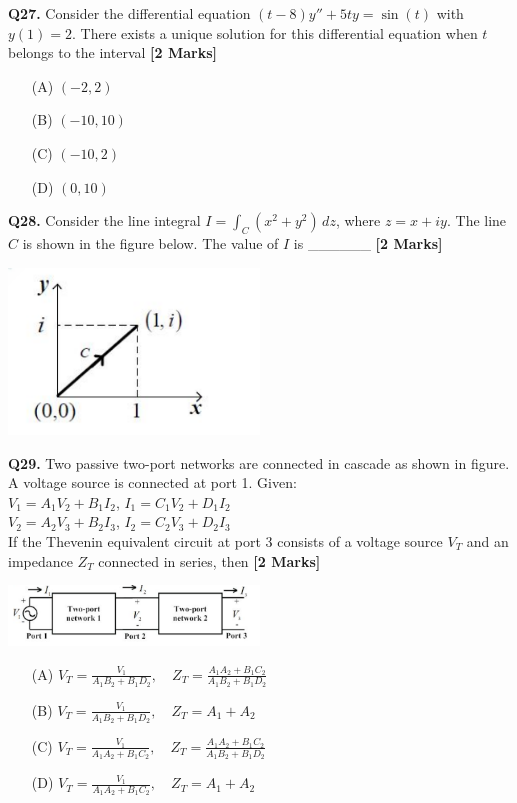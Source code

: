 \documentclass[11pt]{article}
\newcommand{\questionb}[2]{
    \noindent\textbf{Q#2.} #1 \hfill \textbf{[2 Marks]}
}
\begin{document}
\questionb{Consider the differential equation \( (t - 8)y'' + 5ty = \sin(t) \) with \( y(1) = 2 \). There exists a unique solution for this differential equation when \( t \) belongs to the interval}{27}
\begin{enumerate}
    \item[(A)] \( (-2, 2) \)  
    \item[(B)] \( (-10, 10) \)  
    \item[(C)] \( (-10, 2) \)  
    \item[(D)] \( (0, 10) \)  
\end{enumerate}
\vspace{0.5cm}

\questionb{Consider the line integral \( I = \int_C (x^2 + y^2) \, dz \), where \( z = x + iy \). The line \( C \) is shown in the figure below. The value of \( I \) is \_\_\_\_\_\_}{28}
\begin{center}
\includegraphics[width=0.5\textwidth]{figures/28.png}
\end{center}
\vspace{0.5cm}

\questionb{Two passive two-port networks are connected in cascade as shown in figure. A voltage source is connected at port 1. Given: \\
\( V_1 = A_1V_2 + B_1I_2 \), \( I_1 = C_1V_2 + D_1I_2 \) \\
\( V_2 = A_2V_3 + B_2I_3 \), \( I_2 = C_2V_3 + D_2I_3 \) \\
If the Thevenin equivalent circuit at port 3 consists of a voltage source \( V_T \) and an impedance \( Z_T \) connected in series, then}{29}
\begin{center}
\includegraphics[width=0.5\textwidth]{figures/29.png}
\end{center}
\begin{enumerate}
    \item[(A)] \( V_T = \frac{V_1}{A_1B_2 + B_1D_2}, \quad Z_T = \frac{A_1A_2 + B_1C_2}{A_1B_2 + B_1D_2} \)  
    \item[(B)] \( V_T = \frac{V_1}{A_1B_2 + B_1D_2}, \quad Z_T = A_1 + A_2 \)  
    \item[(C)] \( V_T = \frac{V_1}{A_1A_2 + B_1C_2}, \quad Z_T = \frac{A_1A_2 + B_1C_2}{A_1B_2 + B_1D_2} \)  
    \item[(D)] \( V_T = \frac{V_1}{A_1A_2 + B_1C_2}, \quad Z_T = A_1 + A_2 \)  
\end{enumerate}
\vspace{0.5cm}
\end{document}
